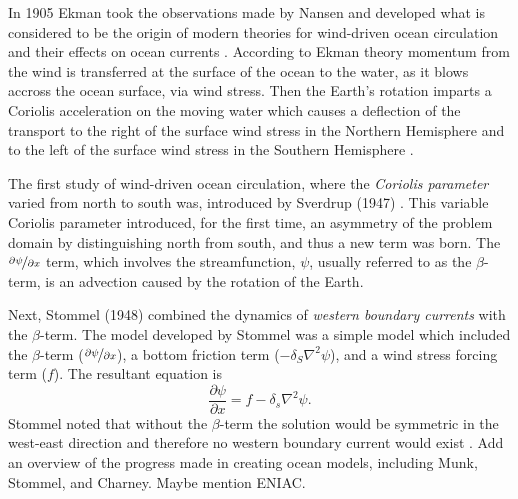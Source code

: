In 1905 Ekman\cite{Ekman1905} took the observations made by Nansen and developed
what is considered to be the origin of modern theories for wind-driven ocean
circulation and their effects on ocean currents \cite{Price1987}. According to
Ekman theory momentum from the wind is transferred at the surface of the ocean
to the water, as it blows accross the ocean surface, via wind stress. Then the
Earth's rotation imparts a Coriolis acceleration on the moving water which
causes a deflection of the transport to the right of the surface wind stress in
the Northern Hemisphere and to the left of the surface wind stress in the
Southern Hemisphere \cite{Beesley2008}.

The first study of wind-driven ocean circulation, where the \emph{Coriolis
parameter} varied from north to south was, introduced by Sverdrup (1947)
\cite{Fox-Kemper2003}. This variable Coriolis parameter introduced, for the
first time, an asymmetry of the problem domain by distinguishing north from
south, and thus a new term was born.  The $\nicefrac{\partial \psi}{\partial x}$
term, which involves the streamfunction, $\psi$, usually referred to as the
$\beta$-term, is an advection caused by the rotation of the Earth.

Next, Stommel (1948) combined the dynamics of \emph{western boundary currents}
with the $\beta$-term. The model developed by Stommel was a simple model which
included the $\beta$-term ($\nicefrac{\partial \psi}{\partial x}$), a bottom
friction term ($-\delta_S \nabla^2 \psi$), and a wind stress forcing term ($f$).
The resultant equation is
\begin{equation}
  \frac{\partial \psi}{\partial x} = f - \delta_s \nabla^2 \psi.
  \label{eqn:StommelModel}
\end{equation}
Stommel noted that without the $\beta$-term the solution would be symmetric in
the west-east direction and therefore no western boundary current would exist
\cite{Stommel1948}.
{\color{red} Add an overview of the progress made in creating ocean models,
including Munk, Stommel, and Charney. Maybe mention ENIAC.}

